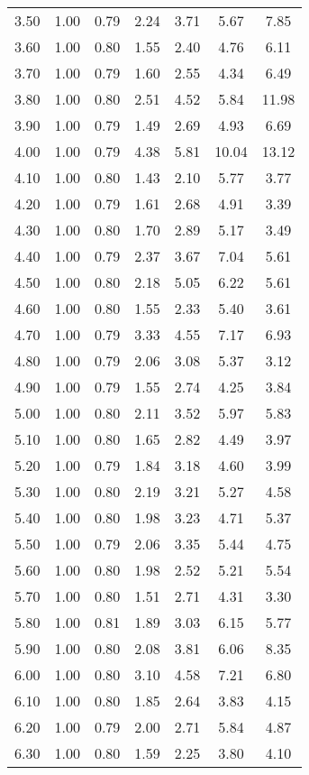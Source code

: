 \begin{table}
\begin{tabular}{lcccccc}
3.50 & 1.00 & 0.79 & 2.24 & 3.71 & 5.67 & 7.85 \\
3.60 & 1.00 & 0.80 & 1.55 & 2.40 & 4.76 & 6.11 \\
3.70 & 1.00 & 0.79 & 1.60 & 2.55 & 4.34 & 6.49 \\
3.80 & 1.00 & 0.80 & 2.51 & 4.52 & 5.84 & 11.98 \\
3.90 & 1.00 & 0.79 & 1.49 & 2.69 & 4.93 & 6.69 \\
4.00 & 1.00 & 0.79 & 4.38 & 5.81 & 10.04 & 13.12 \\
4.10 & 1.00 & 0.80 & 1.43 & 2.10 & 5.77 & 3.77 \\
4.20 & 1.00 & 0.79 & 1.61 & 2.68 & 4.91 & 3.39 \\
4.30 & 1.00 & 0.80 & 1.70 & 2.89 & 5.17 & 3.49 \\
4.40 & 1.00 & 0.79 & 2.37 & 3.67 & 7.04 & 5.61 \\
4.50 & 1.00 & 0.80 & 2.18 & 5.05 & 6.22 & 5.61 \\
4.60 & 1.00 & 0.80 & 1.55 & 2.33 & 5.40 & 3.61 \\
4.70 & 1.00 & 0.79 & 3.33 & 4.55 & 7.17 & 6.93 \\
4.80 & 1.00 & 0.79 & 2.06 & 3.08 & 5.37 & 3.12 \\
4.90 & 1.00 & 0.79 & 1.55 & 2.74 & 4.25 & 3.84 \\
5.00 & 1.00 & 0.80 & 2.11 & 3.52 & 5.97 & 5.83 \\
5.10 & 1.00 & 0.80 & 1.65 & 2.82 & 4.49 & 3.97 \\
5.20 & 1.00 & 0.79 & 1.84 & 3.18 & 4.60 & 3.99 \\
5.30 & 1.00 & 0.80 & 2.19 & 3.21 & 5.27 & 4.58 \\
5.40 & 1.00 & 0.80 & 1.98 & 3.23 & 4.71 & 5.37 \\
5.50 & 1.00 & 0.79 & 2.06 & 3.35 & 5.44 & 4.75 \\
5.60 & 1.00 & 0.80 & 1.98 & 2.52 & 5.21 & 5.54 \\
5.70 & 1.00 & 0.80 & 1.51 & 2.71 & 4.31 & 3.30 \\
5.80 & 1.00 & 0.81 & 1.89 & 3.03 & 6.15 & 5.77 \\
5.90 & 1.00 & 0.80 & 2.08 & 3.81 & 6.06 & 8.35 \\
6.00 & 1.00 & 0.80 & 3.10 & 4.58 & 7.21 & 6.80 \\
6.10 & 1.00 & 0.80 & 1.85 & 2.64 & 3.83 & 4.15 \\
6.20 & 1.00 & 0.79 & 2.00 & 2.71 & 5.84 & 4.87 \\
6.30 & 1.00 & 0.80 & 1.59 & 2.25 & 3.80 & 4.10 \\

\end{tabular}
\end{table}
